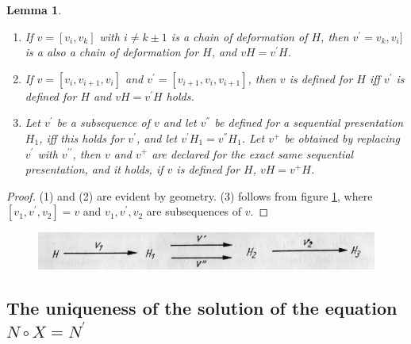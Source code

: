 \documentclass{article}
\newtheorem{lemma}{Lemma}
\begin{document}
\begin{lemma}
  \label{eq:lemma4}
  \begin{enumerate}
    \item If $v = [v_i, v_k]$ with $i \neq k \pm 1$ is a chain of deformation of $H$, then $v^{\prime} = v_k, v_i]$ is a also a chain of deformation for $H$, and $vH =v^{\prime}H$.
    \item If $v = [v_i, v_{i+1}, v_i]$ and $v^{\prime}=[v_{i+1}, v_i, v_{i+1}]$, then $v$ is defined for $H$ iff $v^{\prime}$ is defined for $H$ and $vH = v^{\prime}H$ holds.
    \item Let $v^{\prime}$ be a subsequence of $v$ and let $v^{''}$ be defined for a sequential presentation $H_1$, iff this holds for $v^{\prime}$, and let $v^{\prime}H_1 = v^{''} H_1$. 
          Let $v^{+}$ be obtained by replacing $v^{\prime}$ with $v^{\prime \prime}$, then $v$ and $v^{+}$ are declared for the exact same sequential presentation, and it holds, 
          if $v$ is defined for $H$, $v H = v ^{+} H$.
  \end{enumerate}
\end{lemma}

\begin{proof}
  (1) and (2) are evident by geometry. (3) follows from figure \ref{fig:figure12}, where $[v_1, v^{\prime}, v_2] = v$ and $v_1, v^{\prime}, v_2$ are subsequences of $v$.
\end{proof}

\begin{figure}
\includegraphics[]{figure12.png}
  \centering
\caption{}
\label{fig:figure12}
\end{figure}

\subsection{The uniqueness of the solution of the equation $N\circ X= N^{\prime}$}
\end{document}
